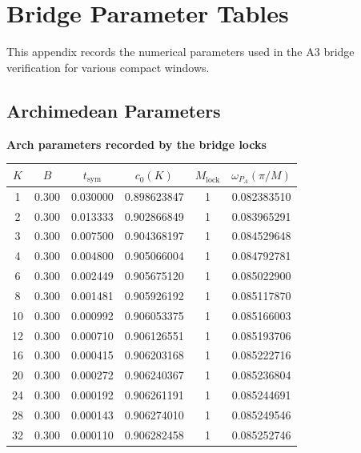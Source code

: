 
\section{Bridge Parameter Tables}\label{ptab:tables}

This appendix records the numerical parameters used in the A3 bridge verification for various compact windows.

\begin{center}
\end{center}

\subsection{Archimedean Parameters}\label{ptab:arch}

\begin{center}
\textbf{Arch parameters recorded by the bridge locks}
\end{center}

\begin{center}
\begin{tabular}{cccccc}
\toprule
$K$ & $B$ & $t_{\mathrm{sym}}$ & $c_0(K)$ & $M_{\mathrm{lock}}$ & $\omega_{P_A}(\pi/M)$ \\
\midrule
1  & 0.300 & 0.030000 & 0.898623847 & 1 & 0.082383510 \\
2  & 0.300 & 0.013333 & 0.902866849 & 1 & 0.083965291 \\
3  & 0.300 & 0.007500 & 0.904368197 & 1 & 0.084529648 \\
4  & 0.300 & 0.004800 & 0.905066004 & 1 & 0.084792781 \\
6  & 0.300 & 0.002449 & 0.905675120 & 1 & 0.085022900 \\
8  & 0.300 & 0.001481 & 0.905926192 & 1 & 0.085117870 \\
10 & 0.300 & 0.000992 & 0.906053375 & 1 & 0.085166003 \\
12 & 0.300 & 0.000710 & 0.906126551 & 1 & 0.085193706 \\
16 & 0.300 & 0.000415 & 0.906203168 & 1 & 0.085222716 \\
20 & 0.300 & 0.000272 & 0.906240367 & 1 & 0.085236804 \\
24 & 0.300 & 0.000192 & 0.906261191 & 1 & 0.085244691 \\
28 & 0.300 & 0.000143 & 0.906274010 & 1 & 0.085249546 \\
32 & 0.300 & 0.000110 & 0.906282458 & 1 & 0.085252746 \\
\bottomrule
\end{tabular}
\end{center}

